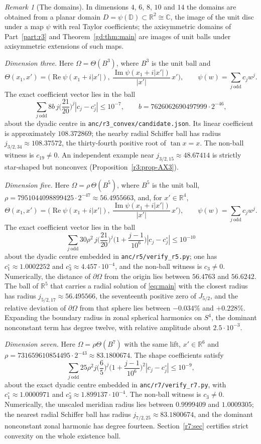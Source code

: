 \documentclass[11pt]{amsart}
\theoremstyle{definition}
\theoremstyle{remark}
\newtheorem{remark}[theorem]{Remark}
\numberwithin{equation}{section}
\newcommand{\R}{\mathbb{R}}
\newcommand{\C}{\mathbb{C}}
\newcommand{\D}{\mathbb{D}}
\DeclareMathOperator{\re}{Re}
\DeclareMathOperator{\im}{Im}
\begin{document}
\begin{remark}[The domains]\label{rem:domain}
In dimensions $4$, $6$, $8$, $10$ and $14$ the domains are obtained from a planar domain $D=\psi(\D)\subset\R^2\cong\C$, the image of the unit disc under a map $\psi$ with real Taylor coefficients; the axisymmetric domains of Part~\ref{part:r3} and Theorem~\ref{gd:thm:main} are images of unit balls under axisymmetric extensions of such maps.

\emph{Dimension three.} Here $\Omega=\Theta(B^3)$, where $B^3$ is the unit ball and
\[
\Theta(x_1,x')=\Big(\re\psi(x_1+i|x'|),\ \frac{\im\psi(x_1+i|x'|)}{|x'|}\,x'\Big),\qquad\psi(w)=\sum_{j\ \mathrm{odd}}c_jw^j .
\]
The exact coefficient vector lies in the ball
\[
\sum_{j\ \mathrm{odd}}8b\,j\Big(\frac{21}{20}\Big)^j|c_j-c_j^\circ|\leq10^{-7},\qquad b=7626062690497999\cdot2^{-46},
\]
about the dyadic centre in \texttt{anc/r3\_convex/candidate.json}. Its linear coefficient is approximately $108.372869$; the nearby radial Schiffer ball has radius $j_{3/2,34}\approx108.37572$, the thirty-fourth positive root of $\tan x=x$. The non-ball witness is $c_{19}\ne0$. An independent example near $j_{3/2,15}\approx48.67414$ is strictly star-shaped but nonconvex (Proposition~\ref{r3:prop-AX3}).

\emph{Dimension five.} Here $\Omega=\rho\,\Theta(B^5)$, where $B^5$ is the unit ball, $\rho=7951044098899425\cdot2^{-47}\approx56.4955663$, and, for $x'\in\R^4$,
\[
\Theta(x_1,x')=\Big(\re\psi(x_1+i|x'|),\ \frac{\im\psi(x_1+i|x'|)}{|x'|}\,x'\Big),\qquad\psi(w)=\sum_{j\ \mathrm{odd}}c_jw^j .
\]
The exact coefficient vector lies in the ball
\[
\sum_{j\ \mathrm{odd}}30\rho^2\,j\Big(\frac{21}{20}\Big)^j\Big(1+\frac{j-1}{10^6}\Big)|c_j-c_j^\circ|\leq10^{-10}
\]
about the dyadic centre embedded in \texttt{anc/r5/verify\_r5.py}; one has $c^\circ_1\approx1.0002252$ and $c^\circ_3\approx4.457\cdot10^{-4}$, and the non-ball witness is $c_3\neq0$. Numerically, the distance of $\partial\Omega$ from the origin lies between $56.4763$ and $56.6242$. The ball of $\R^5$ that carries a radial solution of \eqref{eq:main} with the closest radius has radius $j_{5/2,17}\approx56.495566$, the seventeenth positive zero of $J_{5/2}$, and the relative deviation of $\partial\Omega$ from that sphere lies between $-0.034\%$ and $+0.228\%$. Expanding the boundary radius in zonal spherical harmonics on $S^4$, the dominant nonconstant term has degree twelve, with relative amplitude about $2.5\cdot10^{-3}$.

\emph{Dimension seven.} Here $\Omega=\rho\Theta(B^7)$ with the same lift, $x'\in\R^6$ and $\rho=731659610854495\cdot2^{-43}\approx83.1800674$. The shape coefficients satisfy
\[
\sum_{j\ \mathrm{odd}}25\rho^2j\Big(\frac65\Big)^j\Big(1+\frac{j-1}{10^6}\Big)^2|c_j-c_j^\circ|\leq10^{-9},
\]
about the exact dyadic centre embedded in \texttt{anc/r7/verify\_r7.py}, with $c^\circ_1\approx1.0000971$ and $c^\circ_3\approx1.899137\cdot10^{-4}$. The non-ball witness is $c_3\ne0$. Numerically, the unscaled meridian radius lies between $0.9999409$ and $1.0009305$; the nearest radial Schiffer ball has radius $j_{7/2,25}\approx83.1800674$, and the dominant nonconstant zonal harmonic has degree fourteen. Section~\ref{r7:sec} certifies strict convexity on the whole existence ball.


\end{remark}
\end{document}
